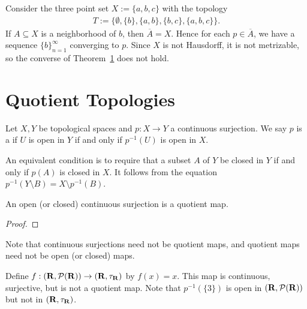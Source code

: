 \begin{example}
    Consider the three point set $X:=\{a,b,c\}$ with the topology 
        \begin{equation*}
        \begin{split}
            T:=\{\emptyset, \{b\}, \{a,b\}, \{b,c\}, \{a,b,c\}\}.
        \end{split}
        \end{equation*}
    If $A \subseteq X$ is a neighborhood of $b$, then $\overline{A} = X$. Hence for each $p \in \overline{A}$, we have a sequence $\{b\}_{n = 1}^\infty$ converging to $p$. Since $X$ is not Hausdorff, it is not metrizable, so the converse of Theorem~\ref{} does not hold.
\end{example}

\section{Quotient Topologies}

\begin{definition}
    Let $X,Y$ be topological spaces and $p:X \rightarrow Y$ a continuous surjection. We say $p$ is a  if $U$ is open in $Y$ if and only if $p^{-1}(U)$ is open in $X$.
\end{definition}

\begin{remark}
An equivalent condition is to require that a subset $A$ of $Y$ be closed in $Y$ if and only if $p(A)$ is closed in $X$. It follows from the equation $p^{-1}(Y \setminus B) = X \setminus p^{-1}(B)$.    
\end{remark}

\begin{proposition}
    An open (or closed) continuous surjection is a quotient map.
\end{proposition}
{\color{red} \begin{proof}
    
\end{proof}}

\begin{remark}
Note that continuous surjections need not be quotient maps, and quotient maps need not be open (or closed) maps.
\end{remark}

\begin{example}
    Define $f:(\mathbf{R}, \mathcal{P}(\mathbf{R})) \rightarrow (\mathbf{R},\tau_{\mathbf{R}})$ by $f(x) = x$. This map is continuous, surjective, but is not a quotient map. Note that $p^{-1}(\{3\})$ is open in $(\mathbf{R},\mathcal{P}(\mathbf{R}))$ but not in $(\mathbf{R},\tau_{\mathbf{R}})$.
\end{example}

